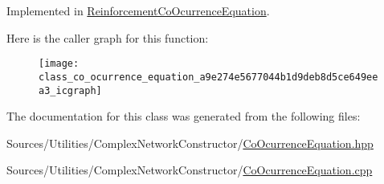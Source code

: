 Implemented in \hyperlink{class_reinforcement_co_ocurrence_equation_ace1a78861a38cfc6ad58584b8f73a846}{Reinforcement\+Co\+Ocurrence\+Equation}.



Here is the caller graph for this function\+:
\nopagebreak
\begin{figure}[H]
\begin{center}
\leavevmode
\texttt{[image: class\_co\_ocurrence\_equation\_a9e274e5677044b1d9deb8d5ce649eea3\_icgraph]}
\end{center}
\end{figure}




The documentation for this class was generated from the following files\+:\begin{DoxyCompactItemize}
\item 
Sources/\+Utilities/\+Complex\+Network\+Constructor/\hyperlink{_co_ocurrence_equation_8hpp}{Co\+Ocurrence\+Equation.\+hpp}\item 
Sources/\+Utilities/\+Complex\+Network\+Constructor/\hyperlink{_co_ocurrence_equation_8cpp}{Co\+Ocurrence\+Equation.\+cpp}\end{DoxyCompactItemize}
